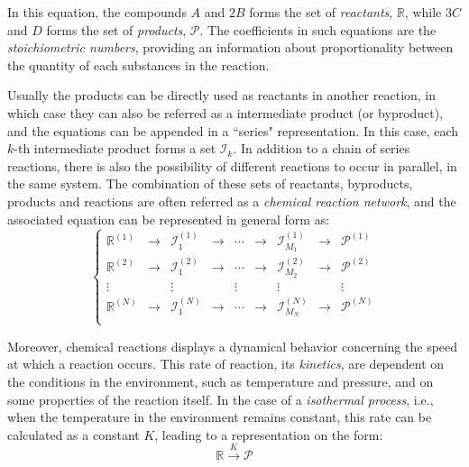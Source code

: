 \documentclass[a4paper,11pt]{book}
\numberwithin{figure}{chapter}
\numberwithin{equation}{chapter}
\numberwithin{table}{chapter}
\theoremstyle{definition}
\begin{document}
In this equation, the compounds $A$ and $2 B$ forms the set of \textit{reactants}, $\mathbb{R}$, while $3 C$ and $D$ forms the set of \textit{products}, $\mathcal{P}$. The coefficients in such equations are the \textit{stoichiometric numbers}, providing an information about proportionality between the quantity of each substances in the reaction. 

Usually the products can be directly used as reactants in another reaction, in which case they can also be referred as a intermediate product (or byproduct), and the equations can be appended in a ``series" representation. In this case, each $k$-th intermediate product forms a set $\mathcal{I}_k$. In addition to a chain of series reactions, there is also the possibility of different reactions to occur in parallel, in the same system. The combination of these sets of reactants, byproducts, products and reactions are often referred as a \textit{chemical reaction network}, and the associated equation can be represented in general form as:
\begin{equation} \label{eq:chemNetwork}
\left\{ \begin{matrix}
    \mathbb{R}^{(1)}  & \longrightarrow & \mathcal{I}^{(1)}_1  &  \longrightarrow & \cdots & \longrightarrow & \mathcal{I}^{(1)}_{M_1} & \longrightarrow & \mathcal{P}^{(1)} \\
    \mathbb{R}^{(2)} & \longrightarrow & \mathcal{I}^{(2)}_1  &  \longrightarrow & \cdots & \longrightarrow & \mathcal{I}^{(2)}_{M_2} & \longrightarrow & \mathcal{P}^{(2)} \\
    \vdots &  & \vdots &  & \vdots &  & \vdots &  & \vdots \\
    \mathbb{R}^{(N)} & \longrightarrow & \mathcal{I}^{(N)}_1  &  \longrightarrow & \cdots & \longrightarrow & \mathcal{I}^{(N)}_{M_N} & \longrightarrow & \mathcal{P}^{(N)} \\
\end{matrix} \right.
\end{equation} 

Moreover, chemical reactions displays a dynamical behavior concerning the speed at which a reaction occurs. This rate of reaction, its \textit{kinetics}, are dependent on the conditions in the environment, such as temperature and pressure, and on some properties of the reaction itself. In the case of a \textit{isothermal process}, i.e., when the temperature in the environment remains constant, this rate can be calculated as a constant $K$, leading to a representation on the form:
\begin{equation}
    \mathbb{R} \overset{K}{\longrightarrow} \mathcal{P}
\end{equation} 
\end{document}

